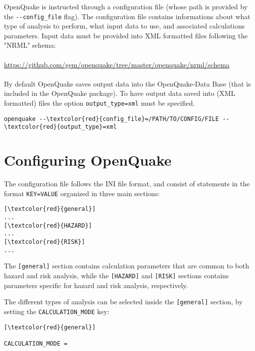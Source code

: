 OpenQuake is instructed through a configuration file (whose path is provided by the \Verb+--config_file+ flag). The configuration file contains informations about what type of analysis to perform, what input data to use, and associated calculations parameters. Input data must be provided into XML formatted files following the "NRML" schema: \\ \\
 \href{https://github.com/gem/openquake/tree/master/openquake/nrml/schema}
{https://github.com/gem/openquake/tree/master/openquake/nrml/schema}\\ \\ 
By default OpenQuake saves output data into the OpenQuake-Data Base (that is included in the OpenQuake package). To have output data saved into (XML formatted) files the option \Verb+output_type=xml+ must be specified.
\begin{Verbatim}[frame=single, commandchars=\\\{\}, samepage=true]
openquake --\textcolor{red}{config_file}=/PATH/TO/CONFIG/FILE --\textcolor{red}{output_type}=xml
\end{Verbatim}

\section{Configuring OpenQuake}
The configuration file follows the INI file format, and consist of statements in the format \Verb+KEY=VALUE+ organized in three main sections:
\begin{Verbatim}[frame=single, commandchars=\\\{\}, samepage=true]
[\textcolor{red}{general}]
...
[\textcolor{red}{HAZARD}]
...
[\textcolor{red}{RISK}]
...
\end{Verbatim}
 
The \Verb+[general]+ section contains calculation parameters that are common to both hazard and risk analysis, while the \Verb+[HAZARD]+ and \Verb+[RISK]+ sections contains parameters specific for hazard and risk analysis, respectively.

The different types of analysis can be selected inside the \Verb+[general]+ section, by setting  the \Verb+CALCULATION_MODE+ key:
\begin{Verbatim}[frame=single, commandchars=\\\{\}, samepage=true]
[\textcolor{red}{general}]

CALCULATION_MODE =
\end{Verbatim}

